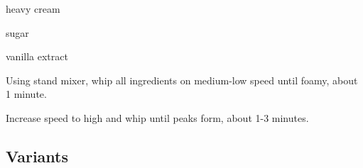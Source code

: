 \documentclass[oneside]{book}  %
\begin{document}
\begin{ingredients}
  \item[1 cup] heavy cream
  \item[1 tsp] sugar
  \item[1.5 tsp] vanilla extract
\end{ingredients}

\begin{directions}
  \item Using stand mixer, whip all ingredients on medium-low speed until foamy,
    about 1 minute.

  \item Increase speed to high and whip until peaks form, about 1-3 minutes.
\end{directions}


\subsection{Variants}
\end{document}
